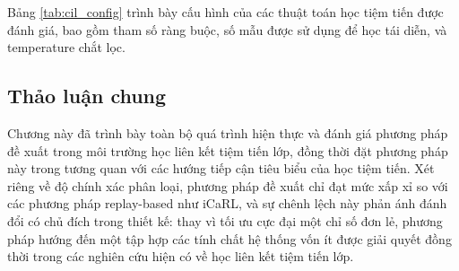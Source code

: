 Bảng \ref{tab:cil_config} trình bày cấu hình của các thuật toán học tiệm tiến được đánh giá, bao gồm tham số ràng buộc, số mẫu được sử dụng để học tái diễn, và temperature chắt lọc.

\begin{table}[H]
    \centering
    \caption{Cấu hình các thuật toán học tiệm tiến.}
    \label{tab:cil_config}
\end{table}


\subsection{Thảo luận chung}

Chương này đã trình bày toàn bộ quá trình hiện thực và đánh giá phương pháp đề xuất trong môi trường học liên kết tiệm tiến lớp, đồng thời đặt phương pháp này trong tương quan với các hướng tiếp cận tiêu biểu của học tiệm tiến. Xét riêng về độ chính xác phân loại, phương pháp đề xuất chỉ đạt mức xấp xỉ so với các phương pháp replay-based như iCaRL, và sự chênh lệch này phản ánh đánh đổi có chủ đích trong thiết kế: thay vì tối ưu cực đại một chỉ số đơn lẻ, phương pháp hướng đến một tập hợp các tính chất hệ thống vốn ít được giải quyết đồng thời trong các nghiên cứu hiện có về học liên kết tiệm tiến lớp.

